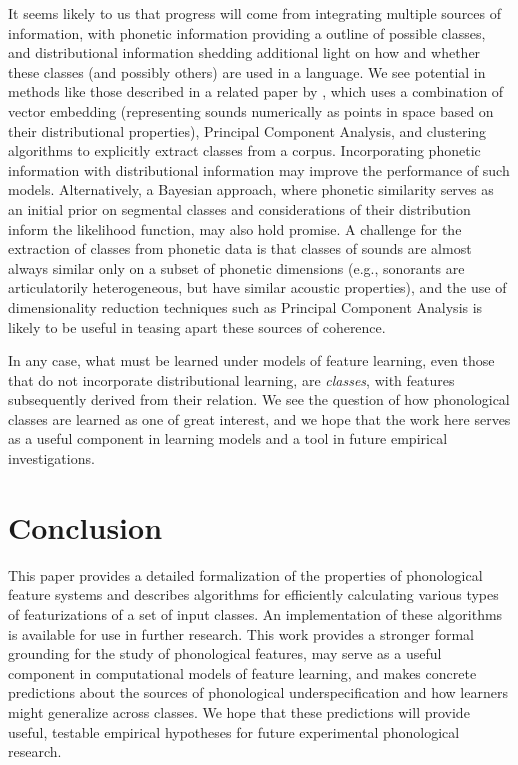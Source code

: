 \documentclass[12pt, oneside]{article}   	%
\begin{document}
It seems likely to us that progress will come from integrating multiple sources of information, with phonetic information providing a outline of possible classes, and distributional information shedding additional light on how and whether these classes (and possibly others) are used in a language. We see potential in methods like those described in a related paper by , which uses a combination of vector embedding (representing sounds numerically as points in space based on their distributional properties), Principal Component Analysis, and clustering algorithms to explicitly extract classes from a corpus. Incorporating phonetic information with distributional information may improve the performance of such models. Alternatively, a Bayesian approach, where phonetic similarity serves as an initial prior on segmental classes and considerations of their distribution inform the likelihood function, may also hold promise. A challenge for the extraction of classes from phonetic data is that classes of sounds are almost always similar only on a subset of phonetic dimensions (e.g., sonorants are articulatorily heterogeneous, but have similar acoustic properties), and the use of dimensionality reduction techniques such as Principal Component Analysis is likely to be useful in teasing apart these sources of coherence.

In any case, what must be learned under models of feature learning, even those that do not incorporate distributional learning, are \textit{classes}, with features subsequently derived from their relation. We see the question of how phonological classes are learned as one of great interest, and we hope that the work here serves as a useful component in learning models and a tool in future empirical investigations.

\FloatBarrier
\section{Conclusion}
\label{sec:conclusion}

This paper provides a detailed formalization of the properties of phonological feature systems and describes algorithms for efficiently calculating various types of featurizations of a set of input classes. An implementation of these algorithms is available for use in further research. This work provides a stronger formal grounding for the study of phonological features, may serve as a useful component in computational models of feature learning, and makes concrete predictions about the sources of phonological underspecification and how learners might generalize across classes. We hope that these predictions will provide useful, testable empirical hypotheses for future experimental phonological research.
\end{document}
